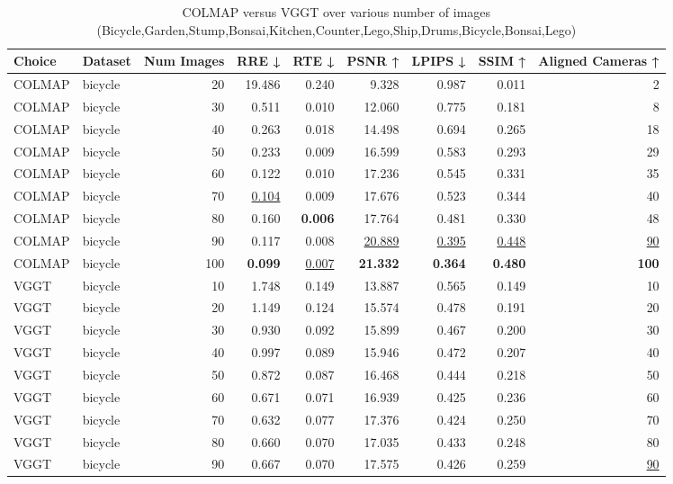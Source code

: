 \begin{table}[H]
\caption{COLMAP versus VGGT over various number of images (Bicycle,Garden,Stump,Bonsai,Kitchen,Counter,Lego,Ship,Drums,Bicycle,Bonsai,Lego)}
\label{tab:01_num_images_bicycle,garden,stump,bonsai,kitchen,counter,lego,ship,drums,bicycle,bonsai,lego}
\small
\begin{tabular}{llrrrrrrr}
\toprule
Choice & Dataset & Num Images & RRE ↓ & RTE ↓ & PSNR ↑ & LPIPS ↓ & SSIM ↑ & Aligned Cameras ↑ \\
\midrule
COLMAP & bicycle & 20 & 19.486 & 0.240 & 9.328 & 0.987 & 0.011 & 2 \\
COLMAP & bicycle & 30 & 0.511 & 0.010 & 12.060 & 0.775 & 0.181 & 8 \\
COLMAP & bicycle & 40 & 0.263 & 0.018 & 14.498 & 0.694 & 0.265 & 18 \\
COLMAP & bicycle & 50 & 0.233 & 0.009 & 16.599 & 0.583 & 0.293 & 29 \\
COLMAP & bicycle & 60 & 0.122 & 0.010 & 17.236 & 0.545 & 0.331 & 35 \\
COLMAP & bicycle & 70 & \underline{0.104} & 0.009 & 17.676 & 0.523 & 0.344 & 40 \\
COLMAP & bicycle & 80 & 0.160 & \textbf{0.006} & 17.764 & 0.481 & 0.330 & 48 \\
COLMAP & bicycle & 90 & 0.117 & 0.008 & \underline{20.889} & \underline{0.395} & \underline{0.448} & \underline{90} \\
COLMAP & bicycle & 100 & \textbf{0.099} & \underline{0.007} & \textbf{21.332} & \textbf{0.364} & \textbf{0.480} & \textbf{100} \\
VGGT & bicycle & 10 & 1.748 & 0.149 & 13.887 & 0.565 & 0.149 & 10 \\
VGGT & bicycle & 20 & 1.149 & 0.124 & 15.574 & 0.478 & 0.191 & 20 \\
VGGT & bicycle & 30 & 0.930 & 0.092 & 15.899 & 0.467 & 0.200 & 30 \\
VGGT & bicycle & 40 & 0.997 & 0.089 & 15.946 & 0.472 & 0.207 & 40 \\
VGGT & bicycle & 50 & 0.872 & 0.087 & 16.468 & 0.444 & 0.218 & 50 \\
VGGT & bicycle & 60 & 0.671 & 0.071 & 16.939 & 0.425 & 0.236 & 60 \\
VGGT & bicycle & 70 & 0.632 & 0.077 & 17.376 & 0.424 & 0.250 & 70 \\
VGGT & bicycle & 80 & 0.660 & 0.070 & 17.035 & 0.433 & 0.248 & 80 \\
VGGT & bicycle & 90 & 0.667 & 0.070 & 17.575 & 0.426 & 0.259 & \underline{90} \\

\end{tabular}
\end{table}
